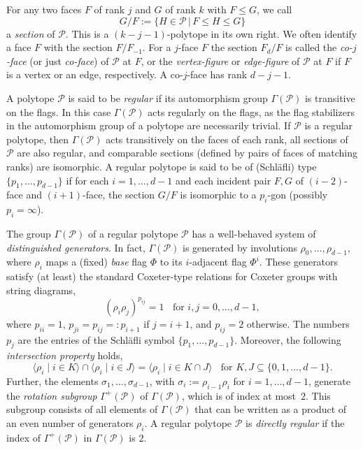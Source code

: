 \documentclass[10pt,a4paper]{amsart}
\theoremstyle{definition}
\begin{document}
For any two faces $F$ of rank $j$ and $G$ of rank $k$ with $F \leq G$, we call
\[G/F := \{ H \in \mathcal{P}\, | \, F \leq H \leq G \}\] 
a \textit{section} of $\mathcal{P}$. This is a $(k-j-1)$-polytope in its own right. We often identify a face $F$ with the section $F/F_{-1}$. For a $j$-face $F$ the section $F_{d}/F$ is called the \textit{co-$j$-face\/} (or just \textit{co-face\/}) of $\mathcal{P}$ at $F$, or the \emph{vertex-figure\/} or \emph{edge-figure\/} of $\mathcal{P}$ at $F$ if $F$ is a vertex or an edge, respectively. A co-$j$-face has rank $d-j-1$.

A polytope $\mathcal{P}$ is said to be \emph{regular\/} if its automorphism group $\Gamma(\mathcal{P})$ is transitive on the flags. In this case $\Gamma(\mathcal{P})$ acts regularly on the flags, as the flag stabilizers in the automorphism group of a polytope are necessarily trivial. If $\mathcal{P}$ is a regular polytope, then $\Gamma(\mathcal{P})$ acts transitively on the faces of each rank, all sections of $\mathcal{P}$ are also regular, and comparable sections (defined by pairs of faces of matching ranks) are isomorphic. A regular polytope is said to be of (Schl\"afli) type $\{p_1,\ldots,p_{d-1}\}$ if for each $i=1,\ldots,d-1$ and each incident pair $F,G$ of $(i-2)$-face and $(i+1)$-face, the section $G/F$ is isomorphic to a $p_i$-gon (possibly $p_{i}=\infty$). 

The group $\Gamma(\mathcal{P})$ of a regular polytope $\mathcal{P}$ has a well-behaved system of \textit{distinguished generators\/}. In fact, $\Gamma(\mathcal{P})$ is generated by involutions $\rho_0,\ldots,\rho_{d-1}$, where $\rho_i$ maps a (fixed) \textit{base\/} flag $\Phi$ to its $i$-adjacent flag $\Phi^i$. These generators satisfy (at least) the standard Coxeter-type relations for Coxeter groups with string diagrams, 
\begin{equation}
\label{standardrel}
(\rho_i \rho_j)^{p_{ij}} = 1 \;\; \textrm{ for } i,j=0, \ldots,d-1,
\end{equation}
where $p_{ii}=1$, $p_{ji} = p_{ij} =: p_{i+1}$ if $j=i+1$, and $p_{ij}=2$ otherwise. The numbers $p_j$ are the entries of the Schl\"afli symbol $\{p_{1},\ldots,p_{d-1}\}$. Moreover, the following {\em intersection property\/} holds,
\begin{equation}
\label{intprop}
\langle \rho_i \mid i \in K \rangle \cap \langle \rho_i \mid i \in J \rangle
= \langle \rho_i \mid i \in {K \cap J} \rangle
  \;\; \textrm{ for } K,J \subseteq \{0,1,\ldots,d-1\}.
\end{equation}
Further, the elements $\sigma_{1},\ldots,\sigma_{d-1}$, with $\sigma_{i}:=\rho_{i-1}\rho_{i}$ for $i=1,\ldots,d-1$, generate the {\em rotation subgroup\/} $\Gamma^{+}(\mathcal{P})$ of $\Gamma(\mathcal{P})$, which is of index at most~$2$. This subgroup consists of all elements of $\Gamma(\mathcal{P})$ that can be written as a product of an even number of generators $\rho_i$. A regular polytope $\mathcal{P}$ is {\em directly regular\/} if the index of $\Gamma^{+}(\mathcal{P})$ in $\Gamma(\mathcal{P})$ is $2$.
\end{document}
